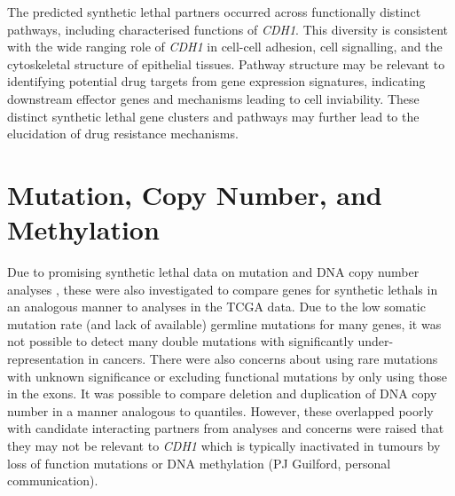 The predicted \gls{synthetic lethal} partners occurred across functionally distinct pathways, including characterised functions of \textit{CDH1}. This diversity is consistent with the wide ranging role of \textit{CDH1} in cell-cell adhesion, cell signalling, and the cytoskeletal structure of epithelial tissues. Pathway structure may be relevant to identifying potential drug targets from \gls{gene expression} signatures, indicating downstream effector genes and mechanisms leading to cell inviability. These distinct \gls{synthetic lethal} gene clusters and pathways may further lead to the elucidation of drug resistance mechanisms.


\FloatBarrier


\iffalse

\section{Mutation, Copy Number, and Methylation}

Due to promising \gls{synthetic lethal} data on \gls{mutation} and \acrshort{DNA} \gls{copy number} analyses \citep{Jerby2014, Lu2015}, these were also investigated to compare genes for \glspl{synthetic lethal} in an analogous manner to  analyses in the \gls{TCGA} data. Due to the low \gls{somatic} \gls{mutation} rate (and lack of available) \gls{germline} \glspl{mutation} for many genes, it was not possible to detect many double \glspl{mutation} with significantly under-representation in cancers. There were also concerns about using rare \glspl{mutation} with unknown significance or excluding functional \glspl{mutation} by only using those in the exons.
It was possible to compare deletion and duplication of \acrshort{DNA} \gls{copy number} in a manner analogous to  quantiles. However, these overlapped poorly with candidate interacting partners from  analyses and concerns were raised that they may not be relevant to \textit{CDH1} which is typically inactivated in tumours by loss of function \glspl{mutation} or \acrshort{DNA} methylation (PJ Guilford, personal communication).   

